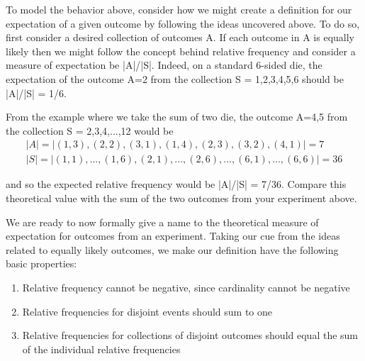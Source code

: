 \documentclass[10pt,]{book}
\theoremstyle{plain}
\theoremstyle{definition}
\theoremstyle{definition}
\theoremstyle{definition}
\numberwithin{equation}{section}
\begin{document}
		To model the behavior above, consider how we might create a definition for our expectation
		of a given outcome by following the ideas uncovered above. To do so, first consider a desired collection
		of outcomes A. If each outcome in A is equally likely then we might follow the concept behind relative 
		frequency and consider a measure of expectation be |A|/|S|. Indeed, on a standard 
		6-sided die, the expectation of the outcome A={2} from the collection S = {1,2,3,4,5,6} should be
		|A|/|S| = 1/6.%
\par
From the example where we take the sum of two die, the outcome A={4,5} from the
		collection S = {2,3,4,...,12} would be%
\begin{gather*}
|A| = | {(1,3),(2,2),(3,1),(1,4),(2,3),(3,2),(4,1)}| = 7\\
|S| = | {(1,1),...,(1,6),(2,1),...,(2,6),...,(6,1),...,(6,6)}| = 36
\end{gather*}\par
and so the expected relative frequency would be |A|/|S| = 7/36. Compare this theoretical value
		with the sum of the two outcomes from your experiment above.%
\par
We are ready to now formally give a name to the theoretical measure of expectation for
		outcomes from an experiment. Taking our cue from the ideas related to equally likely outcomes, we 
		make our definition have the following basic properties:%
\leavevmode%
\begin{enumerate}
\item\hypertarget{li-105}{}Relative frequency cannot be negative, since cardinality cannot be negative%
\item\hypertarget{li-106}{}Relative frequencies for disjoint events should sum to one%
\item\hypertarget{li-107}{}Relative frequencies for collections of disjoint outcomes should equal the sum of the
		individual relative frequencies%
\end{enumerate}
\typeout{************************************************}
\typeout{************************************************}
\end{document}
